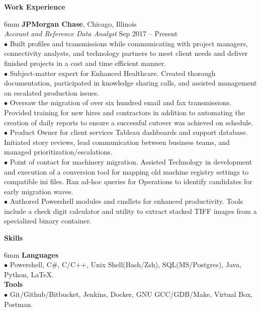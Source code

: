 \documentclass[11pt]{article}
\newcommand{\sectionheader}[1]{\noindent \textbf{\large #1}}
\newenvironment{sectionbody}{\begin{adjustwidth}{6mm}{}}{\end{adjustwidth}}
\begin{document}
\vspace{2mm}

\sectionheader{Work Experience}
\begin{sectionbody}
{\bf JPMorgan Chase}, Chicago, Illinois \\
\textit{Account and Reference Data Analyst} \hfill Sep 2017 -- Present \\
$\bullet$ Built profiles and transmissions while communicating with project managers, connectivity analysts, and technology partners to meet client needs and deliver finished projects in a cost and time efficient manner. \\
$\bullet$ Subject-matter expert for Enhanced Healthcare. Created thorough documentation, participated in knowledge sharing calls, and assisted management on escalated production issues. \\
$\bullet$ Oversaw the migration of over six hundred email and fax transmissions. Provided training for new hires and contractors in addition to automating the creation of daily reports to ensure a successful cutover was achieved on schedule. \\
$\bullet$ Product Owner for client services Tableau dashboards and support database. Initiated story reviews, lead communication between business teams, and managed prioritization/escalations. \\
$\bullet$ Point of contact for machinery migration. Assisted Technology in development and execution of a conversion tool for mapping old machine registry settings to compatible ini files. Ran ad-hoc queries for Operations to identify candidates for early migration waves. \\
$\bullet$ Authored Powershell modules and cmdlets for enhanced productivity. Tools include a check digit calculator and utility to extract stacked TIFF images from a specialized binary container. \\
\end{sectionbody}

\vspace{2mm}

\sectionheader{Skills}
\begin{sectionbody}
{\bf Languages} \\
    $\bullet$ Powershell, C\#, C/C++, Unix Shell(Bash/Zsh), SQL(MS/Postgres), Java, Python, \LaTeX. \\
{\bf Tools} \\
$\bullet$ Git/Github/Bitbucket, Jenkins, Docker, GNU GCC/GDB/Make, Virtual Box, Postman.
\end{sectionbody}
\end{document}

